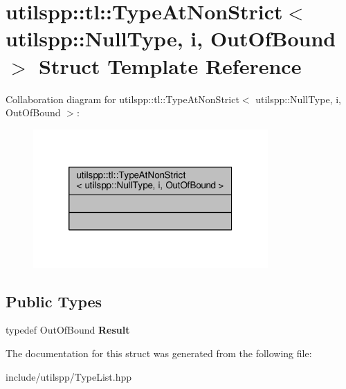 \hypertarget{structutilspp_1_1tl_1_1TypeAtNonStrict_3_01utilspp_1_1NullType_00_01i_00_01OutOfBound_01_4}{\section{utilspp\-:\-:tl\-:\-:Type\-At\-Non\-Strict$<$ utilspp\-:\-:Null\-Type, i, Out\-Of\-Bound $>$ Struct Template Reference}
\label{structutilspp_1_1tl_1_1TypeAtNonStrict_3_01utilspp_1_1NullType_00_01i_00_01OutOfBound_01_4}
}


Collaboration diagram for utilspp\-:\-:tl\-:\-:Type\-At\-Non\-Strict$<$ utilspp\-:\-:Null\-Type, i, Out\-Of\-Bound $>$\-:\nopagebreak
\begin{figure}[H]
\begin{center}
\leavevmode
\includegraphics[width=254pt]{structutilspp_1_1tl_1_1TypeAtNonStrict_3_01utilspp_1_1NullType_00_01i_00_01OutOfBound_01_4__coll__graph}
\end{center}
\end{figure}
\subsection*{Public Types}
\begin{DoxyCompactItemize}
\item 
\hypertarget{structutilspp_1_1tl_1_1TypeAtNonStrict_3_01utilspp_1_1NullType_00_01i_00_01OutOfBound_01_4_a59206b4646725a9324127ea0806d0430}{typedef Out\-Of\-Bound {\bfseries Result}}\label{structutilspp_1_1tl_1_1TypeAtNonStrict_3_01utilspp_1_1NullType_00_01i_00_01OutOfBound_01_4_a59206b4646725a9324127ea0806d0430}

\end{DoxyCompactItemize}


The documentation for this struct was generated from the following file\-:\begin{DoxyCompactItemize}
\item 
include/utilspp/Type\-List.\-hpp\end{DoxyCompactItemize}
